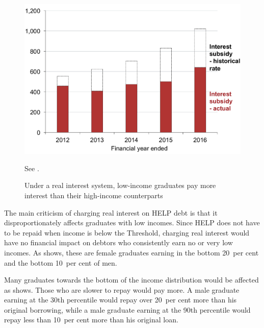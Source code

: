 \documentclass{grattan}
\begin{document}
\begin{figure}[t]\vspace{1pt}
\caption{Under a real interest system, low-income graduates pay more interest than their high-income counterparts}\label{fig:fig13-under-real-interest-low-income-grads-pay-more-interest-than-high-income-counterparts}


\includegraphics[page=13]{atlas/Chartpack.pdf}

%
{See .}
\end{figure}

The main criticism of charging real interest on \gls{HELP} debt is that it disproportionately affects graduates with low incomes.
Since  \gls{HELP} does not have to be repaid when income is below the \gls{Threshold}, charging real interest would have no financial impact on debtors who consistently earn no or very low incomes.
As  shows, these are female graduates earning in the bottom 20~per cent and the bottom 10~per cent of men.

Many graduates towards the bottom of the income distribution would be affected as
 shows.
Those who are slower to repay would pay more. 
A male graduate earning at the 30{th} percentile would repay over 20~per cent more than his original borrowing, while a male graduate earning at the 90th percentile would repay less than 10~per cent more than his original loan.
\end{document}
